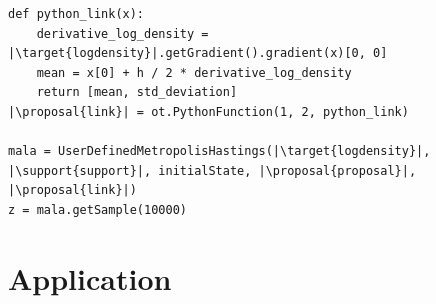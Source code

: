 \documentclass{beamer}
\newcommand{\target}[1]{\textcolor{red}{#1}}
\newcommand{\proposal}[1]{\textcolor{blue}{#1}}
\newcommand{\support}[1]{\textcolor{orange}{#1}}
\begin{document}
\begin{frame}[containsverbatim]
\begin{lstlisting}
def python_link(x):
    derivative_log_density = |\target{logdensity}|.getGradient().gradient(x)[0, 0]
    mean = x[0] + h / 2 * derivative_log_density
    return [mean, std_deviation]
|\proposal{link}| = ot.PythonFunction(1, 2, python_link)

mala = UserDefinedMetropolisHastings(|\target{logdensity}|, |\support{support}|, initialState, |\proposal{proposal}|, |\proposal{link}|)
z = mala.getSample(10000)
\end{lstlisting}

\end{frame}


\section{Application}
\end{document}
